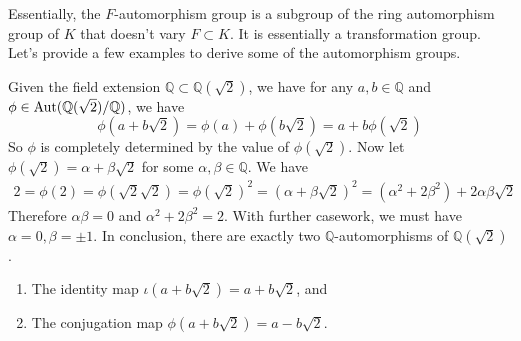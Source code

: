   Essentially, the $F$-automorphism group is a subgroup of the ring automorphism group of $K$ that doesn't vary $F \subset K$. It is essentially a transformation group. Let's provide a few examples to derive some of the automorphism groups. 

  \begin{example}
    Given the field extension $\mathbb{Q} \subset \mathbb{Q}(\sqrt{2})$, we have for any $a, b \in \mathbb{Q}$ and $\phi \in \Aut(\mathbb{Q}(\sqrt{2})/\mathbb{Q})$, we have 
    \begin{equation}
      \phi(a + b \sqrt{2}) = \phi(a) + \phi(b \sqrt{2}) = a + b \phi(\sqrt{2}) 
    \end{equation}
    So $\phi$ is completely determined by the value of $\phi(\sqrt{2})$. Now let $\phi(\sqrt{2}) = \alpha + \beta \sqrt{2}$ for some $\alpha, \beta \in \mathbb{Q}$. We have 
    \begin{align}
      2 = \phi(2) = \phi(\sqrt{2} \sqrt{2}) = \phi(\sqrt{2})^2 = (\alpha + \beta\sqrt{2})^2 = (\alpha^2 + 2 \beta^2) + 2 \alpha \beta \sqrt{2} 
    \end{align}
    Therefore $\alpha \beta = 0$ and $\alpha^2 + 2 \beta^2 = 2$. With further casework, we must have $\alpha = 0, \beta = \pm 1$. In conclusion, there are exactly two $\mathbb{Q}$-automorphisms of $\mathbb{Q}(\sqrt{2})$. 
    \begin{enumerate}
      \item The identity map $\iota(a + b \sqrt{2}) = a + b \sqrt{2}$, and 
      \item The conjugation map $\phi(a + b \sqrt{2}) = a - b \sqrt{2}$. 
    \end{enumerate}
  \end{example}

